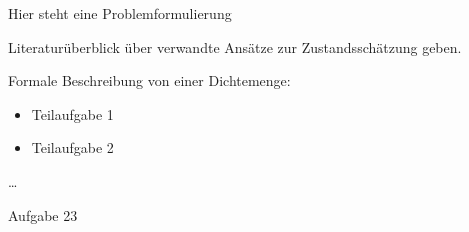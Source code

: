 \documentclass{thesistasksheet}
\begin{document}
\Beginning

Hier steht eine Problemformulierung

\begin{tasks}
\item Literaturüberblick über verwandte Ansätze zur Zustandsschätzung geben.
\item Formale Beschreibung von einer Dichtemenge:
  \begin{itemize}
  \item Teilaufgabe 1
  \item Teilaufgabe 2
  \end{itemize}
\item \ldots
\item Aufgabe 23
\end{tasks}%
\end{document}

